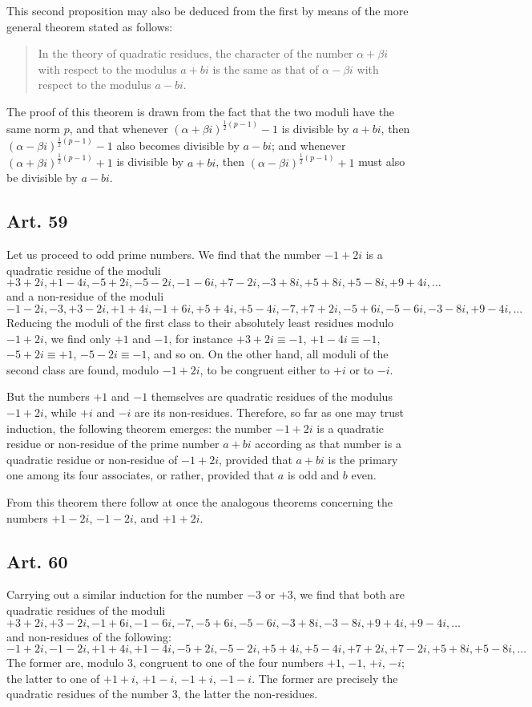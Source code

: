 \documentclass[12pt]{article}
\newcommand{\art}[1]{\subsection*{Art. #1}}
\begin{document}
This second proposition may also be deduced from the first by means of the more general theorem stated as follows:

\begin{quote}
In the theory of quadratic residues, the character of the number $\alpha+\beta i$ with respect to the modulus $a+bi$ is the same as that of $\alpha-\beta i$ with respect to the modulus $a-bi$.
\end{quote}
The proof of this theorem is drawn from the fact that the two moduli have the same norm $p$, and that whenever $(\alpha+\beta i)^{\frac12(p-1)}-1$ is divisible by $a+bi$, then $(\alpha-\beta i)^{\frac12(p-1)}-1$ also becomes divisible by $a-bi$; and whenever $(\alpha+\beta i)^{\frac12(p-1)}+1$ is divisible by $a+bi$, then $(\alpha-\beta i)^{\frac12(p-1)}+1$ must also be divisible by $a-bi$.

\art{59}
Let us proceed to odd prime numbers. We find that the number $-1+2i$ is a quadratic residue of the moduli
\[
+3+2i,
+1-4i,
-5+2i,
-5-2i,
-1-6i,
+7-2i,
-3+8i,
+5+8i,
+5-8i,
+9+4i,\ldots
\]
and a non-residue of the moduli
\[
-1-2i,
-3,
+3-2i,
+1+4i,
-1+6i,
+5+4i,
+5-4i,
-7,
+7+2i,
-5+6i,
-5-6i,
-3-8i,
+9-4i,\ldots
\]
Reducing the moduli of the first class to their absolutely least residues modulo $-1+2i$, we find only $+1$ and $-1$, for instance $+3+2i\equiv-1$, $+1-4i\equiv-1$, $-5+2i\equiv+1$, $-5-2i\equiv-1$, and so on. On the other hand, all moduli of the second class are found, modulo $-1+2i$, to be congruent either to $+i$ or to $-i$.

But the numbers $+1$ and $-1$ themselves are quadratic residues of the modulus $-1+2i$, while $+i$ and $-i$ are its non-residues. Therefore, so far as one may trust induction, the following theorem emerges: the number $-1+2i$ is a quadratic residue or non-residue of the prime number $a+bi$ according as that number is a quadratic residue or non-residue of $-1+2i$, provided that $a+bi$ is the primary one among its four associates, or rather, provided that $a$ is odd and $b$ even.

From this theorem there follow at once the analogous theorems concerning the numbers $+1-2i$, $-1-2i$, and $+1+2i$.

\art{60}
Carrying out a similar induction for the number $-3$ or $+3$, we find that both are quadratic residues of the moduli
\[
+3+2i,
+3-2i,
-1+6i,
-1-6i,
-7,
-5+6i,
-5-6i,
-3+8i,
-3-8i,
+9+4i,
+9-4i,\ldots
\]
and non-residues of the following:
\[
-1+2i,
-1-2i,
+1+4i,
+1-4i,
-5+2i,
-5-2i,
+5+4i,
+5-4i,
+7+2i,
+7-2i,
+5+8i,
+5-8i,\ldots
\]
The former are, modulo $3$, congruent to one of the four numbers $+1$, $-1$, $+i$, $-i$; the latter to one of $+1+i$, $+1-i$, $-1+i$, $-1-i$. The former are precisely the quadratic residues of the number $3$, the latter the non-residues.
\end{document}
